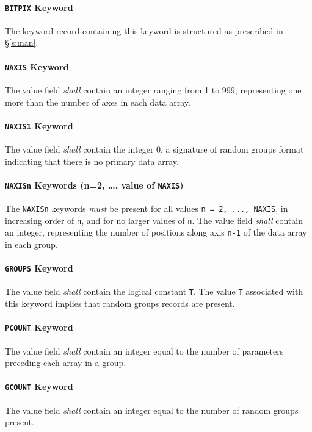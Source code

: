 \documentclass[11pt,makeidx]{book}     %
\begin{document}
   \paragraph{{\tt BITPIX} Keyword}
   The keyword record containing this keyword is structured as 
   prescribed in
   \S\ref{s:man}.
  
   \paragraph{{\tt NAXIS} Keyword}
   The value field {\em shall} contain an integer ranging from 1 to
   999, representing one more than the number of axes in each
   data array.
  
   \paragraph{{\tt NAXIS1} Keyword}
   The value field {\em shall} contain the integer 0, a signature of
   random groups format indicating that there is 
   no primary data array.
  
   \paragraph{{\tt NAXISn} 
   Keywords (n=2, \ldots, value of {\tt NAXIS})}
   The {\tt NAXISn} keywords {\em must} be present 
   for all values {\tt n = 2, ..., NAXIS}, in increasing order of {\tt n}, and for 
   no larger values of {\tt n}.
   The value field {\em shall} contain an integer, representing 
   the number of positions along axis {\tt n-1} of the 
   data array in each group.  
  
   \paragraph{{\tt GROUPS} Keyword}
   The value field {\em shall} contain the logical constant {\tt T}. 
   The
   value {\tt T} associated with this keyword implies that random groups 
   records are present.
  
   \paragraph{{\tt PCOUNT} Keyword}
   The value field {\em shall} contain an integer equal to the
   number
   of parameters preceding each array in a group.
  
   \paragraph{{\tt GCOUNT} Keyword}
   The value field {\em shall} contain an integer equal to the
   number of random groups present.
  
\end{document}

